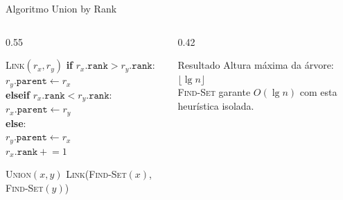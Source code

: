 \documentclass[aspectratio=169]{beamer}
\begin{document}
\begin{frame}{Algoritmo Union by Rank}%
  \begin{columns}[T]
    \begin{column}{0.55\textwidth}
      \begin{block}{\textsc{Link}$(r_x, r_y)$}
        \textbf{if} $r_x.\texttt{rank} > r_y.\texttt{rank}$:\\
        \quad $r_y.\texttt{parent} \leftarrow r_x$\\
        \textbf{elseif} $r_x.\texttt{rank} < r_y.\texttt{rank}$:\\
        \quad $r_x.\texttt{parent} \leftarrow r_y$\\
        \textbf{else}:\\
        \quad $r_y.\texttt{parent} \leftarrow r_x$\\
        \quad $r_x.\texttt{rank} \mathrel{+}= 1$
      \end{block}
      \begin{block}{\textsc{Union}$(x,y)$}
        \textsc{Link}(\textsc{Find-Set}$(x)$, \textsc{Find-Set}$(y)$)
      \end{block}
    \end{column}
    \begin{column}{0.42\textwidth}
      \begin{exampleblock}{Resultado}
        Altura máxima da árvore: $\lfloor\lg n\rfloor$\\[4pt]
        \textsc{Find-Set} garante $O(\lg n)$ com esta heurística isolada.
      \end{exampleblock}
    \end{column}
  \end{columns}
\end{frame}
\end{document}
